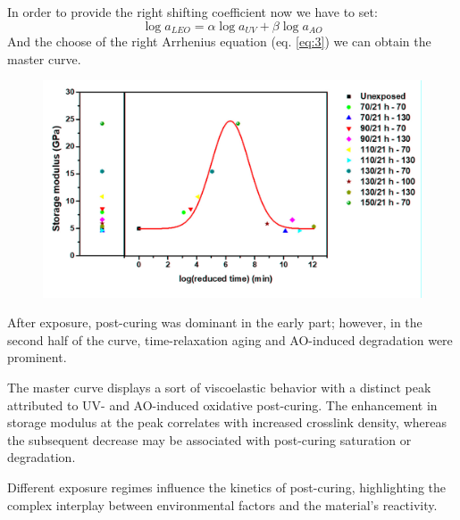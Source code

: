 \documentclass[10pt]{beamer}
\begin{document}
\begin{frame}
In order to provide the right shifting coefficient now we have to set: 
\[\log a_{LEO} = \alpha\log a_{UV} + \beta\log a_{AO}\]
And the choose of the right Arrhenius equation (eq. \ref{eq:3}) we can obtain the master curve.  
\begin{figure}[H]
\centering
\includegraphics[width=0.5\linewidth]{figures/screenshot012}
\label{fig:screenshot012}
\end{figure}
After exposure, post-curing was dominant in the early part; however,
in the second half of the curve, time-relaxation aging and AO-induced degradation
were prominent.
\end{frame}

\begin{frame}
The master curve displays a sort of viscoelastic behavior with a distinct peak attributed to UV- and AO-induced oxidative post-curing. The enhancement in storage modulus at the peak correlates with increased crosslink density, whereas the subsequent decrease may be associated with post-curing saturation or degradation. \newline 

Different exposure regimes influence the kinetics of post-curing, highlighting the complex interplay between environmental factors and the material's reactivity.
\end{frame}
\end{document}
